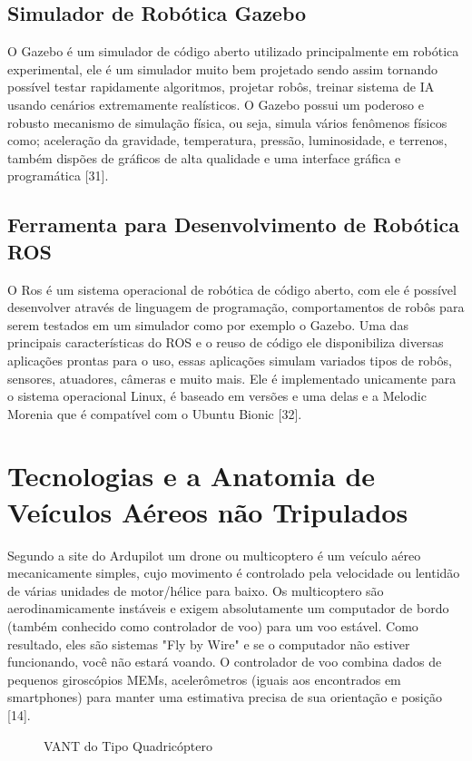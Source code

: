 \subsection{Simulador de Robótica Gazebo}
O Gazebo é um simulador de código aberto utilizado principalmente em robótica experimental, ele é um simulador muito bem projetado sendo assim tornando possível testar rapidamente algoritmos, projetar robôs, treinar sistema de IA usando cenários extremamente realísticos. O Gazebo possui um poderoso e robusto mecanismo de simulação física, ou seja, simula vários fenômenos físicos como; aceleração da gravidade, temperatura, pressão, luminosidade, e terrenos, também dispões de gráficos de alta qualidade e uma interface gráfica e programática [31]. 
\subsection{Ferramenta para Desenvolvimento de Robótica ROS}
O Ros é um sistema operacional de robótica de código aberto, com ele é possível desenvolver através de linguagem de programação, comportamentos de robôs para serem testados em um simulador como por exemplo o Gazebo. Uma das principais características do ROS e o reuso de código ele disponibiliza diversas aplicações prontas para o uso, essas aplicações simulam variados tipos de robôs, sensores, atuadores, câmeras e muito mais. Ele é implementado unicamente para o sistema operacional Linux, é baseado em versões e uma delas e a Melodic Morenia que é compatível com o Ubuntu Bionic [32].
\section{Tecnologias e a Anatomia de Veículos Aéreos não Tripulados}
Segundo a site do Ardupilot um drone ou multicoptero é um veículo aéreo mecanicamente simples, cujo movimento é controlado pela velocidade ou lentidão de várias unidades de motor/hélice para baixo.
Os multicoptero são aerodinamicamente instáveis e exigem absolutamente um computador de bordo (também conhecido como controlador de voo) para um voo estável. Como resultado, eles são sistemas "Fly by Wire" e se o computador não estiver funcionando, você não estará voando. O controlador de voo combina dados de pequenos giroscópios MEMs, acelerômetros (iguais aos encontrados em smartphones) para manter uma estimativa precisa de sua orientação e posição [14].

%
\begin{figure}[H]
	\centering
	\caption{VANT do Tipo Quadricóptero}
	\fontsize{9pt}{12pt}\selectfont
	\def\svgwidth{15cm}
	
	\label{fig:quad}
\end{figure}

